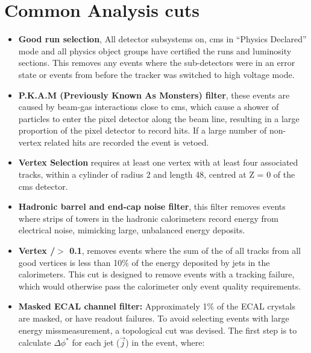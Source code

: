 

\section{Common Analysis cuts} %
\label{sec:common_analysis_cuts}



\begin{itemize}
\item \textbf{Good run selection}, All detector subsystems on, \ac{cms} in 
``Physics Declared'' mode and all physics object groups have certified the runs 
and luminosity sections. This removes any events where the sub-detectors were 
in an error state or events from before the tracker was switched to high 
voltage mode.
\item \textbf{P.K.A.M (Previously Known As Monsters) filter}, these events are 
caused by beam-gas interactions close to \ac{cms}, which cause a shower of 
particles to enter the pixel detector along the beam line, resulting in a large 
proportion of the pixel detector to record hits. If a large number of non-vertex related hits are recorded the event is vetoed.
\item \textbf{Vertex Selection} requires at least one vertex with at 
least four associated tracks, within a cylinder of radius \unit{2}{\cm} and 
length \unit{48}{\cm}, centred at Z = 0 of the \ac{cms} detector.
\item \textbf{Hadronic barrel and end-cap noise filter}, this filter removes 
events where strips of towers in the hadronic calorimeters record energy from 
electrical noise, mimicking large, unbalanced energy deposits.
\item \textbf{Vertex \PT/\HT $>$ 0.1}, removes events where the sum of the 
\PT of all tracks from all good vertices is less than 10$\%$ of the energy 
deposited by jets in the calorimeters. This cut is designed to remove events 
with a tracking failure, which would otherwise pass the calorimeter only event 
quality requirements.
\item\textbf{Masked ECAL channel filter:} Approximately 1$\%$ of the ECAL 
crystals are masked, or have readout failures. To avoid selecting events with 
large energy missmeasurement, a topological cut was devised. The first step is 
to calculate $\Delta\phi^{*}$ for each jet ($\vec{j}$) in the event, where:

\end{itemize}
